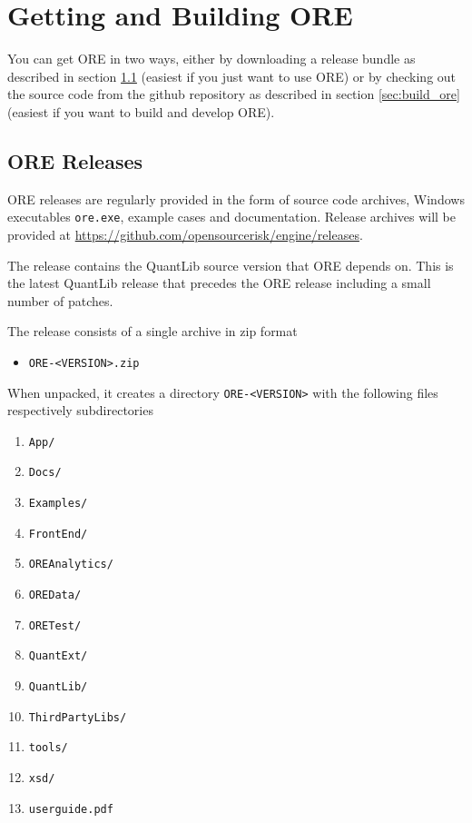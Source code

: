 \documentclass[12pt, a4paper]{article}
\begin{document}
\section{Getting and Building ORE}\label{sec:installation}

You can get ORE in two ways, either by downloading a release bundle as described in section \ref{sec:release} (easiest if you just want to use ORE) or by
checking out the source code from the github repository as described in section \ref{sec:build_ore} (easiest if you want to build and develop ORE).

\subsection{ORE Releases}\label{sec:release}

ORE releases are regularly provided in the form of source code archives, Windows exe\-cutables {\tt ore.exe}, example
cases and documentation. Release archives will be provided at \url{https://github.com/opensourcerisk/engine/releases}.

The release contains the QuantLib source version that ORE depends on. This is the latest QuantLib release that precedes the ORE release including a small number of patches.

\medskip
The release consists of a single archive in zip format
\begin{itemize}
\item {\tt ORE-<VERSION>.zip}
\end{itemize}

When unpacked, it creates a directory {\tt ORE-<VERSION>} with the following files respectively subdirectories
\begin{enumerate}
\item {\tt App/}
\item {\tt Docs/}
\item {\tt Examples/}
\item {\tt FrontEnd/}
\item {\tt OREAnalytics/}
\item {\tt OREData/}
\item {\tt ORETest/}
\item {\tt QuantExt/}
\item {\tt QuantLib/}
\item {\tt ThirdPartyLibs/}
\item {\tt tools/}
\item {\tt xsd/}
\item {\tt userguide.pdf}
\end{enumerate} 
\end{document}
